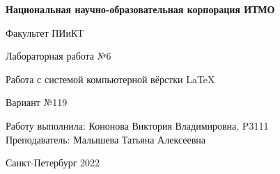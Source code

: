 \begin{titlepage}
	\newpage
	\begin{center}
		{\bfseries Национальная научно-образовательная корпорация ИТМО
}
		
		Факультет ПИиКТ
		\vspace{6em}
		
		Лабораторная работа №6 \\
		
		
	\end{center}
	
	
	
	\begin{center}
		\Large Работа с системой компьютерной вёрстки \LaTeX \linebreak
	\end{center}
	
	\begin{center}
		Вариант №119
	\end{center}
	\vspace{\fill}
	
	
	\noindent Работу выполнила: Кононова Виктория Владимировна, P3111 \\
	Преподаватель: Малышева Татьяна Алексеевна
	
	\vspace{3em}
	
	
	
	\begin{center}
		Санкт-Петербург 2022
	\end{center}
	
\end{titlepage}